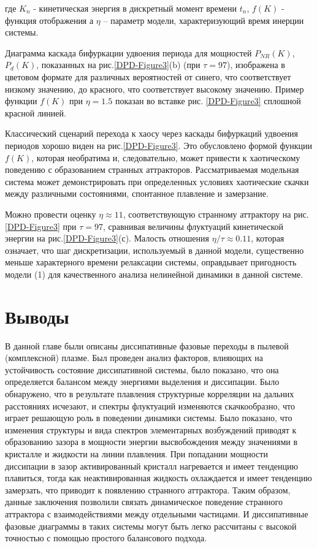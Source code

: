 где $K_n$ - кинетическая энергия в дискретный момент времени $t_n$, $f(K)$ - функция отображения 
а $\eta$ -- параметр модели, характеризующий время инерции системы. 


Диаграмма каскада бифуркации удвоения периода для мощностей 
$P_{NR}(K)$, $P_{d}(K)$, показанных на рис.\ref{DPD-Figure3}(b) (при $\tau = 97$), изображена в цветовом формате для различных вероятностей от синего, что соответствует низкому значению, до красного, что соответствует высокому значению.
Пример функции $f (K)$ при $\eta = 1.5$ показан во вставке рис. \ref{DPD-Figure3} сплошной красной линией.

  Классический сценарий перехода к хаосу через каскады бифуркаций удвоения периодов \cite{Lichtenberg} хорошо виден на рис.\ref{DPD-Figure3}. Это обусловлено формой 
  функции $f (K)$, которая необратима и, следовательно, может привести к хаотическому поведению с образованием странных аттракторов. 
Рассматриваемая модельная система может демонстрировать при определенных условиях хаотические скачки между 
  различными состояниями, спонтанное плавление и замерзание. 
   
Можно провести оценку $\eta \approx 11$, соответствующую странному аттрактору на рис.\ref{DPD-Figure3} при $\tau = 97$, сравнивая величины 
   флуктуаций кинетической энергии на рис.\ref{DPD-Figure3}(с). Малость отношения $\eta / \tau \approx 0.11$, которая означает, что шаг дискретизации, используемый в данной модели, существенно меньше 
   характерного времени релаксации системы, оправдывает пригодность модели (1) для качественного анализа нелинейной 
   динамики в данной системе.
   
\section{Выводы}     
В данной главе были описаны диссипативные фазовые переходы в пылевой (комплексной) плазме. Был проведен анализ факторов, влияющих на устойчивость состояние диссипативной системы, было показано, что она определяется балансом между энергиями выделения и диссипации. Было обнаружено, что в результате плавления структурные корреляции на дальних расстояниях
исчезают, и
спектры флуктуаций изменяются скачкообразно, что играет решающую роль в поведении динамики системы. Было показано, что изменения структуры и вида спектров элементарных возбуждений приводят к образованию зазора в мощности энергии высвобождения между
значениями в кристалле и жидкости на линии плавления. 
При попадании мощности диссипации в зазор активированный кристалл
нагревается и имеет тенденцию плавиться, тогда как неактивированная
жидкость охлаждается и имеет тенденцию замерзать, что приводит к появлению странного аттрактора. Таким образом, данные заключения позволили связать динамическое поведение странного аттрактора
с взаимодействиями между отдельными частицами.
И диссипативные фазовые диаграммы в таких
системы могут быть легко рассчитаны с высокой точностью с помощью простого балансового
подхода.